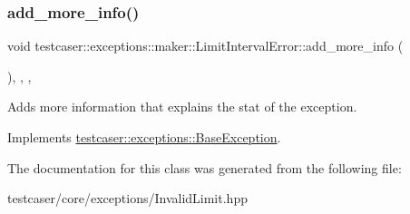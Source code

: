 \subsubsection{\texorpdfstring{add\_more\_info()}{add\_more\_info()}}
{\footnotesize\ttfamily void testcaser\+::exceptions\+::maker\+::\+Limit\+Interval\+Error\+::add\+\_\+more\+\_\+info (\begin{DoxyParamCaption}{ }\end{DoxyParamCaption})\hspace{0.3cm}{\ttfamily [inline]}, {\ttfamily [final]}, {\ttfamily [override]}, {\ttfamily [virtual]}}



Adds more information that explains the stat of the exception. 



Implements \mbox{\hyperlink{classtestcaser_1_1exceptions_1_1BaseException_ad607ea04e2cb4ad9b8d0e2e6b6734f2f}{testcaser\+::exceptions\+::\+Base\+Exception}}.



The documentation for this class was generated from the following file\+:\begin{DoxyCompactItemize}
\item 
testcaser/core/exceptions/Invalid\+Limit.\+hpp\end{DoxyCompactItemize}
